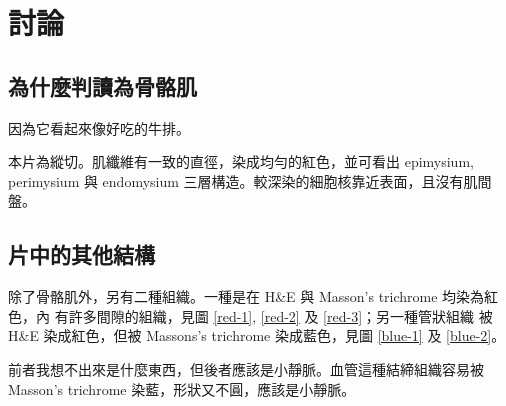 \documentclass[a4paper,twocolumn]{article}
\begin{document}
\section{討論}
\subsection{為什麼判讀為骨骼肌}
因為它看起來像好吃的牛排。

本片為縱切。肌纖維有一致的直徑，染成均勻的紅色，並可看出 epimysium, perimysium
與 endomysium 三層構造。較深染的細胞核靠近表面，且沒有肌間盤。

\subsection{片中的其他結構}
除了骨骼肌外，另有二種組織。一種是在 H\&E 與 Masson's trichrome 均染為紅色，內
有許多間隙的組織，見圖 \ref{red-1}, \ref{red-2} 及 \ref{red-3}；另一種管狀組織
被 H\&E 染成紅色，但被 Massons's trichrome 染成藍色，見圖 \ref{blue-1} 及
\ref{blue-2}。

前者我想不出來是什麼東西，但後者應該是小靜脈。血管這種結締組織容易被 Masson's
trichrome 染藍，形狀又不圓，應該是小靜脈。
\end{document}
